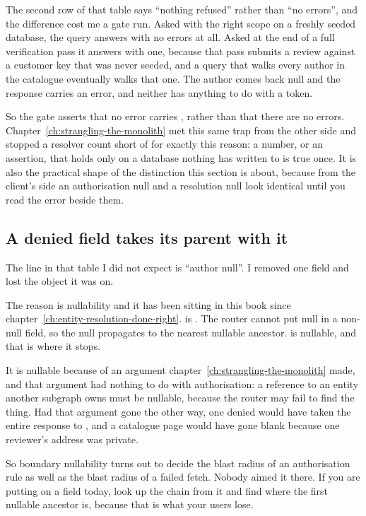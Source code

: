 %
The second row of that table says \enquote{nothing refused} rather than
\enquote{no errors}, and the difference cost me a gate run. Asked with the
right scope on a freshly seeded database, the query answers with no errors at
all. Asked at the end of a full verification pass it answers with one, because
that pass submits a review against a customer key that was never seeded, and a
query that walks every author in the catalogue eventually walks that one. The
author comes back null and the response carries an error, and neither has
anything to do with a token.

So the gate asserts that no error carries
, rather than that there are no errors.
Chapter~\ref{ch:strangling-the-monolith} met this same trap from the other
side and stopped a resolver count short of  for exactly
this reason: a number, or an assertion, that holds only on a database nothing
has written to is true once. It is also the practical shape of the distinction
this section is about, because from the client's side an authorisation null and
a resolution null look identical until you read the error beside them.

\subsection*{A denied field takes its parent with it}

%
The line in that table I did not expect is \enquote{author null}. I removed one
field and lost the object it was on.

The reason is nullability and it has been sitting in this book since
chapter~\ref{ch:entity-resolution-done-right}.  is .
The router cannot put null in a non-null field, so the null propagates to the
nearest nullable ancestor.  is nullable, and that is where
it stops.

It is nullable because of an argument
chapter~\ref{ch:strangling-the-monolith} made, and that argument had nothing to
do with authorisation: a reference to an entity another subgraph owns must be
nullable, because the router may fail to find the thing. Had that argument gone
the other way, one denied  would have taken the entire response to
, and a catalogue page would have gone blank because one
reviewer's address was private.

So boundary nullability turns out to decide the blast radius of an
authorisation rule as well as the blast radius of a failed fetch. Nobody aimed
it there. If you are putting  on a field today, look up
the chain from it and find where the first nullable ancestor is, because that
is what your users lose.

